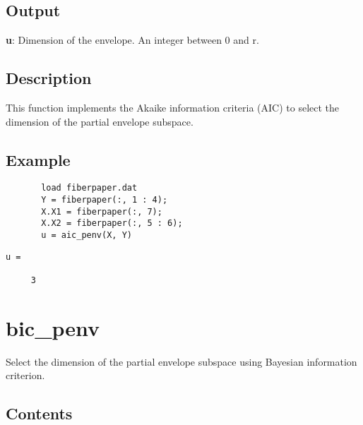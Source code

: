 \documentclass[a4paper,11pt,openany]{memoir}
\begin{document}
\subsection*{Output}

\begin{par}
\textbf{u}: Dimension of the envelope. An integer between 0 and r.
\end{par} \vspace{1em}


\subsection*{Description}

\begin{par}
This function implements the Akaike information criteria (AIC) to select the dimension of the partial envelope subspace.
\end{par} \vspace{1em}


\subsection*{Example}


\begin{verbatim}       load fiberpaper.dat
       Y = fiberpaper(:, 1 : 4);
       X.X1 = fiberpaper(:, 7);
       X.X2 = fiberpaper(:, 5 : 6);
       u = aic_penv(X, Y)\end{verbatim}
    
        \color{lightgray}\ttfamily \begin{verbatim}
u =

     3

\end{verbatim} \rmfamily
\color{black}
    

\newpage

\rmfamily
\color{black}\section{bic\_penv}

\begin{par}
Select the dimension of the partial envelope subspace using Bayesian information criterion.
\end{par} \vspace{1em}

\subsection*{Contents}
\end{document}

